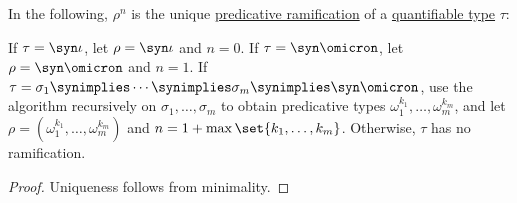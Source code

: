 \begin{proposition}\label{thm:predicative_ramification_of_type}
  In the following, \( \rho^n \) is the unique \hyperref[def:ramified_theory_of_types/predicativity]{predicative ramification} of a \hyperref[def:quantifiable_type]{quantifiable type} \( \tau \):
  \begin{thmenum}
     If \( \tau = \syn\iota \), let \( \rho = \syn\iota \) and \( n = 0 \).
     If \( \tau = \syn\omicron \), let \( \rho = \syn\omicron \) and \( n = 1 \).
     If \( \tau = \sigma_1 \synimplies \cdots \synimplies \sigma_m \synimplies \syn\omicron \), use the algorithm recursively on \( \sigma_1, \ldots, \sigma_m \) to obtain predicative types \( \omega_1^{k_1}, \ldots, \omega_m^{k_m} \), and let \( \rho = (\omega_1^{k_1}, \ldots, \omega_m^{k_m}) \) and \( n = 1 + \max\set{ k_1, \ldots, k_m } \).
     Otherwise, \( \tau \) has no ramification.
  \end{thmenum}
\end{proposition}
\begin{proof}
  Uniqueness follows from minimality.
\end{proof}


